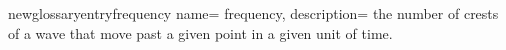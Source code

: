 newglossaryentry{frequency}
 {
    name= frequency,
    description= {the number of crests of a wave that move past a given point in a given unit of time.}
}
